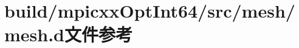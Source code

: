\hypertarget{build_2mpicxxOptInt64_2src_2mesh_2mesh_8d}{
\section{build/mpicxxOptInt64/src/mesh/mesh.d文件参考}
\label{build_2mpicxxOptInt64_2src_2mesh_2mesh_8d}
}
